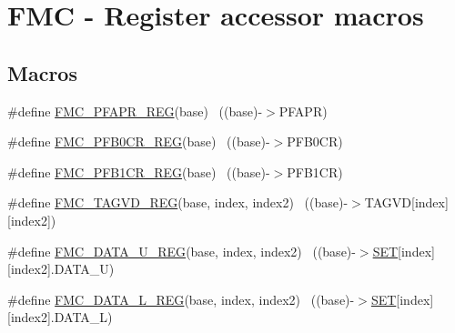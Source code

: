 \hypertarget{group___f_m_c___register___accessor___macros}{}\section{F\+MC -\/ Register accessor macros}
\label{group___f_m_c___register___accessor___macros}
\subsection*{Macros}
\begin{DoxyCompactItemize}
\item 
\#define \hyperlink{group___f_m_c___register___accessor___macros_gad43fcfd90789921daaef07d85d5da199}{F\+M\+C\+\_\+\+P\+F\+A\+P\+R\+\_\+\+R\+EG}(base)                                        ~((base)-\/$>$P\+F\+A\+PR)
\item 
\#define \hyperlink{group___f_m_c___register___accessor___macros_gabab99bf1038b07a5ffe56d7075184b65}{F\+M\+C\+\_\+\+P\+F\+B0\+C\+R\+\_\+\+R\+EG}(base)                                      ~((base)-\/$>$P\+F\+B0\+CR)
\item 
\#define \hyperlink{group___f_m_c___register___accessor___macros_gaf6b5ee99ce57d8870974b8bc5928a19f}{F\+M\+C\+\_\+\+P\+F\+B1\+C\+R\+\_\+\+R\+EG}(base)                                      ~((base)-\/$>$P\+F\+B1\+CR)
\item 
\#define \hyperlink{group___f_m_c___register___accessor___macros_ga69adb2f34bbe33d04c2075cee0e7d5f4}{F\+M\+C\+\_\+\+T\+A\+G\+V\+D\+\_\+\+R\+EG}(base,  index,  index2)              ~((base)-\/$>$T\+A\+G\+VD\mbox{[}index\mbox{]}\mbox{[}index2\mbox{]})
\item 
\#define \hyperlink{group___f_m_c___register___accessor___macros_ga77e953c0a13be535a400b4fce86c0601}{F\+M\+C\+\_\+\+D\+A\+T\+A\+\_\+\+U\+\_\+\+R\+EG}(base,  index,  index2)            ~((base)-\/$>$\hyperlink{group___l_p_c___types___public___types_gga89136caac2e14c55151f527ac02daaffab44c8101cc294c074709ec1b14211792}{S\+ET}\mbox{[}index\mbox{]}\mbox{[}index2\mbox{]}.D\+A\+T\+A\+\_\+U)
\item 
\#define \hyperlink{group___f_m_c___register___accessor___macros_ga4a86395060ba1ded814dbe8cc6eb0e8c}{F\+M\+C\+\_\+\+D\+A\+T\+A\+\_\+\+L\+\_\+\+R\+EG}(base,  index,  index2)            ~((base)-\/$>$\hyperlink{group___l_p_c___types___public___types_gga89136caac2e14c55151f527ac02daaffab44c8101cc294c074709ec1b14211792}{S\+ET}\mbox{[}index\mbox{]}\mbox{[}index2\mbox{]}.D\+A\+T\+A\+\_\+L)

\end{DoxyCompactItemize}
